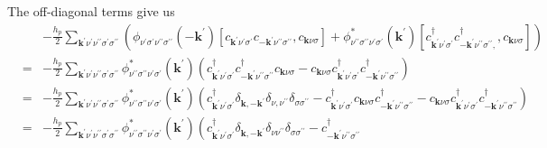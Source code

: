 The off-diagonal terms give us
\begin{eqnarray}
\nonumber
& & -\frac{h_p}{2}
\sum_{\mathbf{k}^{\prime}\nu^{\prime}\nu^{\prime\prime}\sigma^{\prime}\sigma^{\prime\prime}}
\left(\phi_{\nu^{\prime}\sigma^{\prime}\nu^{\prime\prime}\sigma^{\prime\prime}}(-\mathbf{k}^{\prime})
\left[ c_{\mathbf{k}^{\prime}\nu^{\prime}\sigma^{\prime}}
c_{-\mathbf{k}^{\prime}\nu^{\prime\prime}\sigma^{\prime\prime}},
c_{\mathbf{k}\nu\sigma}\right]
+
\phi^*_{\nu^{\prime\prime}\sigma^{\prime\prime}\nu^{\prime}\sigma^{\prime}}(\mathbf{k}^{\prime})
\left[c^{\dagger}_{\mathbf{k}^{\prime}\nu^{\prime}\sigma^{\prime}}
c^{\dagger}_{-\mathbf{k}^{\prime}\nu^{\prime\prime}\sigma^{\prime\prime},},
c_{\mathbf{k}\nu\sigma}\right]
\right) \\
& = &
- \frac{h_p}{2}
\sum_{\mathbf{k}^{\prime}\nu^{\prime}\nu^{\prime\prime}\sigma^{\prime}\sigma^{\prime\prime}}
\phi^*_{\nu^{\prime\prime}\sigma^{\prime\prime}\nu^{\prime}\sigma^{\prime}}(\mathbf{k}^{\prime})
\left(
c^{\dagger}_{\mathbf{k}^{\prime}\nu^{\prime}\sigma^{\prime}}
c^{\dagger}_{-\mathbf{k}^{\prime}\nu^{\prime\prime}\sigma^{\prime\prime}}
c_{\mathbf{k}\nu\sigma}-
c_{\mathbf{k}\nu\sigma}
c^{\dagger}_{\mathbf{k}^{\prime}\nu^{\prime}\sigma^{\prime}}
c^{\dagger}_{-\mathbf{k}^{\prime}\nu^{\prime\prime}\sigma^{\prime\prime}}
\right) \\
\nonumber
& = &
- \frac{h_p}{2}
\sum_{\mathbf{k}^{\prime}\nu^{\prime}\nu^{\prime\prime}\sigma^{\prime}\sigma^{\prime\prime}}
\phi^*_{\nu^{\prime\prime}\sigma^{\prime\prime}\nu^{\prime}\sigma^{\prime}}(\mathbf{k}^{\prime})
\left(c^{\dagger}_{\mathbf{k}^{\prime}\nu^{\prime}\sigma^{\prime}}
\delta_{\mathbf{k},-\mathbf{k}^{\prime}}\delta_{\nu,\nu^{\prime\prime}}
\delta_{\sigma\sigma^{\prime\prime}}
-c^{\dagger}_{\mathbf{k}^{\prime}\nu^{\prime}\sigma^{\prime}}
c_{\mathbf{k}\nu\sigma}
c^{\dagger}_{-\mathbf{k}^{\prime}\nu^{\prime\prime}\sigma^{\prime\prime}}
-c_{\mathbf{k}\nu\sigma}
c^{\dagger}_{\mathbf{k}^{\prime}\nu^{\prime}\sigma^{\prime}}
c^{\dagger}_{-\mathbf{k}^{\prime}\nu^{\prime\prime}\sigma^{\prime\prime}}\right) \\
& = &
- \frac{h_p}{2}
\sum_{\mathbf{k}^{\prime}\nu^{\prime}\nu^{\prime\prime}\sigma^{\prime}\sigma^{\prime\prime}}
\phi^*_{\nu^{\prime\prime}\sigma^{\prime\prime}\nu^{\prime}\sigma^{\prime}}(\mathbf{k}^{\prime})
\left(c^{\dagger}_{\mathbf{k}^{\prime}\nu^{\prime}\sigma^{\prime}}
\delta_{\mathbf{k},-\mathbf{k}^{\prime}}\delta_{\nu\nu^{\prime\prime}}
\delta_{\sigma\sigma^{\prime\prime}}
-c^{\dagger}_{-\mathbf{k}^{\prime}\nu^{\prime\prime}\sigma^{\prime\prime}}

\end{eqnarray}

